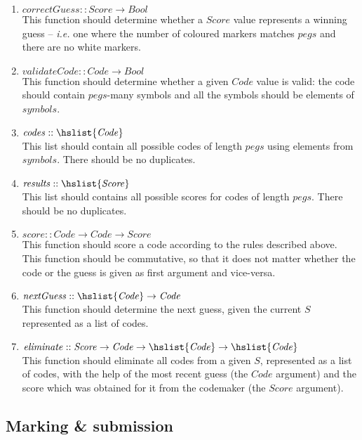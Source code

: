 \documentclass{cs256-shared/cs256}
\begin{document}
\begin{enumerate}
	\item $\mathit{correctGuess} :: \mathit{Score} \to \mathit{Bool}$\\
	This function should determine whether a $\mathit{Score}$ value represents a winning guess -- \emph{i.e.} one where the number of coloured markers matches $\mathit{pegs}$ and there are no white markers.
	\item $\mathit{validateCode} :: \mathit{Code} \to \mathit{Bool}$\\
	This function should determine whether a given $\mathit{Code}$ value is valid: the code should contain $\mathit{pegs}$-many symbols and all the symbols should be elements of $\mathit{symbols}$.
	\item $\mathit{codes} :: \hslist{\mathit{Code}}$\\
	This list should contain all possible codes of length $\mathit{pegs}$ using elements from $\mathit{symbols}$. There should be no duplicates.
	\item $\mathit{results} :: \hslist{\mathit{Score}}$\\
	This list should contains all possible scores for codes of length $\mathit{pegs}$. There should be no duplicates.
	\item $\mathit{score} :: \mathit{Code} \to \mathit{Code} \to \mathit{Score}$\\
	This function should score a code according to the rules described above. This function should be commutative, so that it does not matter whether the code or the guess is given as first argument and vice-versa.
	\item $\mathit{nextGuess} :: \hslist{\mathit{Code}} \to \mathit{Code}$ \\
	This function should determine the next guess, given the current $S$ represented as a list of codes.
	\item $\mathit{eliminate} :: \mathit{Score} \to \mathit{Code} \to \hslist{\mathit{Code}} \to \hslist{\mathit{Code}}$\\
	This function should eliminate all codes from a given $S$, represented as a list of codes, with the help of the most recent guess (the $\mathit{Code}$ argument) and the score which was obtained for it from the codemaker (the $\mathit{Score}$ argument).
\end{enumerate}


\subsection*{Marking \& submission}
\end{document}
